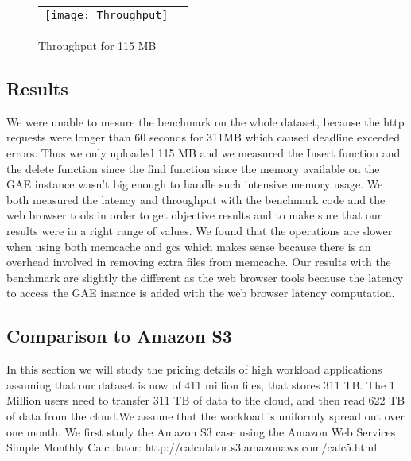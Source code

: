 \documentclass{article}
\begin{document}
\begin{figure}[!ht]
\centering
\begin{tabular}{cc}
\texttt{[image: Throughput]}
\end{tabular}
\caption{Throughput for 115 MB}
\end{figure}

\subsection{Results}
We were unable to mesure the benchmark on the whole dataset, because the http requests were longer than 60 seconds for 311MB which caused deadline exceeded errors. Thus we only uploaded 115 MB and we measured the Insert function and the delete function since the find function since the memory available on the GAE instance wasn't big enough to handle such intensive memory usage. We both measured the latency and throughput with the benchmark code and the web browser tools in order to get objective results and to make sure that our results were in a right range of values. We found that the operations are slower when using both memcache and gcs which makes sense because there is an overhead involved in removing extra files from memcache. Our results with the benchmark are slightly the different as the web browser tools because the latency to access the GAE insance is added with the web browser latency computation. 
\subsection{Comparison to Amazon S3}



In this section we will study the pricing details of high workload applications assuming that our dataset is now of 411 million files, that stores 311 TB. The 1 Million users need to transfer 311 TB of data to the cloud, and then read 622 TB of data from the cloud.We assume that the workload is uniformly spread out over one month. We first study the Amazon S3 case using the Amazon Web Services Simple Monthly Calculator: http://calculator.s3.amazonaws.com/calc5.html\\
\end{document}
